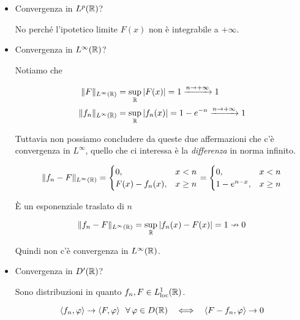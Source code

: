 \begin{itemize}
\item Convergenza in $L^{p}(\mathbb{R})$?

No perché l'ipotetico limite $F(x)$ non è integrabile a $ + \infty $.
\item Convergenza in $L^{\infty }(\mathbb{R})$?

Notiamo che

\begin{equation*}
\begin{aligned}
\Vert F\Vert _{L^{\infty }(\mathbb{R})} & = \sup _{\mathbb{R} }| F(x)| = 1\xrightarrow{n\rightarrow + \infty } 1\\
\Vert f_{n}\Vert _{L^{\infty }(\mathbb{R})} & = \sup _{\mathbb{R} }| f_{n}(x)| = 1 - e^{ - n}\xrightarrow{n\rightarrow + \infty } 1
\end{aligned}
\end{equation*}

Tuttavia non possiamo concludere da queste due affermazioni che c'è convergenza in $L^{\infty }$, quello che ci interessa è la \textit{differenza} in norma infinito.

\begin{equation*}
\Vert f_{n} - F\Vert _{L^{\infty }(\mathbb{R})} = 
\begin{cases}
0, & x < n\\
F(x) - f_{n}(x) , & x\geq n
\end{cases} = 
\begin{cases}
0, & x < n\\
1 - e^{n - x} , & x\geq n
\end{cases}
\end{equation*}

È un esponenziale traslato di $n$

\begin{equation*}
\Vert f_{n} - F\Vert _{L^{\infty }(\mathbb{R})} = \sup _{\mathbb{R} }| f_{n}(x) - F(x)| = 1\nrightarrow 0
\end{equation*}

Quindi non c'è convergenza in $L^{\infty }(\mathbb{R})$.
\item Convergenza in $D'(\mathbb{R})$?

Sono distribuzioni in quanto $f_{n} ,F\in L^{1}_{\operatorname{loc}}(\mathbb{R})$.

\begin{equation*}
\langle f_{n} ,\varphi \rangle \rightarrow \langle F,\varphi \rangle \ \ \forall \varphi \in D(\RR) \ \ \iff \ \ \langle F - f_{n} ,\varphi \rangle \rightarrow 0
\end{equation*}


\end{itemize}

